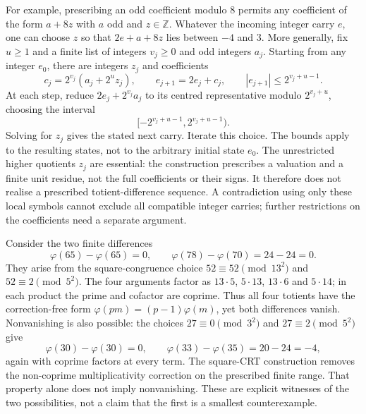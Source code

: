 \begin{obs}\label{prop:B5-kill}
For example, prescribing an odd coefficient modulo $8$ permits any
coefficient of the form $a+8z$ with $a$ odd and $z\in\mathbb Z$.
Whatever the incoming integer carry $e$, one can choose $z$ so that
$2e+a+8z$ lies between $-4$ and $3$.
More generally, fix $u\ge1$ and a finite list of integers
$v_j\ge0$ and odd integers $a_j$. Starting from any integer $e_0$,
there are integers $z_j$ and coefficients
\[
 c_j=2^{v_j}(a_j+2^u z_j),\qquad
 e_{j+1}=2e_j+c_j,
 \qquad |e_{j+1}|\le2^{v_j+u-1}.
\]
At each step, reduce $2e_j+2^{v_j}a_j$ to its centred representative
modulo $2^{v_j+u}$, choosing the interval
\[
 [-2^{v_j+u-1},2^{v_j+u-1}).
\]
Solving for $z_j$ gives the stated next carry. Iterate this choice. The bounds apply to the resulting
states, not to the arbitrary initial state $e_0$.
The unrestricted higher quotients $z_j$ are essential: the construction
prescribes a valuation and a finite unit residue, not the full
coefficients or their signs. It therefore does not realise a prescribed
totient-difference sequence. A contradiction using only these local
symbols cannot exclude all compatible integer carries; further
restrictions on the coefficients need a separate argument.
\end{obs}

\begin{obs}\label{prop:B8-kill}
Consider the two finite differences
\[
 \varphi(65)-\varphi(65)=0,\qquad
 \varphi(78)-\varphi(70)=24-24=0.
\]
They arise from the square-congruence choice
$52\equiv52\pmod{13^2}$ and $52\equiv2\pmod{5^2}$.
The four arguments factor as $13\cdot5$, $5\cdot13$,
$13\cdot6$ and $5\cdot14$; in each product the prime and cofactor
are coprime. Thus all four totients have the correction-free form
$\varphi(pm)=(p-1)\varphi(m)$, yet both differences vanish.
Nonvanishing is also possible: the choices
$27\equiv0\pmod{3^2}$ and $27\equiv2\pmod{5^2}$ give
\[
 \varphi(30)-\varphi(30)=0,\qquad
 \varphi(33)-\varphi(35)=20-24=-4,
\]
again with coprime factors at every term.
The square-CRT construction removes the non-coprime multiplicativity
correction on the prescribed finite range. That property alone does
not imply nonvanishing. These are explicit witnesses of the two
possibilities, not a claim that the first is a smallest counterexample.
\end{obs}

